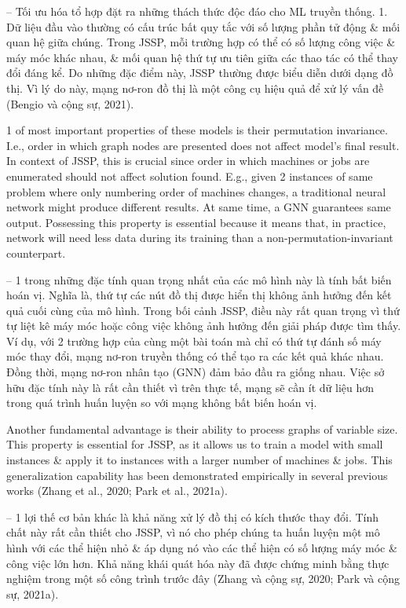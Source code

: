 \documentclass{article}
\begin{document}
\begin{itemize}
    -- Tối ưu hóa tổ hợp đặt ra những thách thức độc đáo cho ML truyền thống. 1. Dữ liệu đầu vào thường có cấu trúc bất quy tắc với số lượng phần tử động \& mối quan hệ giữa chúng. Trong JSSP, mỗi trường hợp có thể có số lượng công việc \& máy móc khác nhau, \& mối quan hệ thứ tự ưu tiên giữa các thao tác có thể thay đổi đáng kể. Do những đặc điểm này, JSSP thường được biểu diễn dưới dạng đồ thị. Vì lý do này, mạng nơ-ron đồ thị là một công cụ hiệu quả để xử lý vấn đề (Bengio và cộng sự, 2021).

    1 of most important properties of these models is their permutation invariance. I.e., order in which graph nodes are presented does not affect model's final result. In context of JSSP, this is crucial since order in which machines or jobs are enumerated should not affect solution found. E.g., given 2 instances of same problem where only numbering order of machines changes, a traditional neural network might produce different results. At same time, a GNN guarantees same output. Possessing this property is essential because it means that, in practice, network will need less data during its training than a non-permutation-invariant counterpart.

    -- 1 trong những đặc tính quan trọng nhất của các mô hình này là tính bất biến hoán vị. Nghĩa là, thứ tự các nút đồ thị được hiển thị không ảnh hưởng đến kết quả cuối cùng của mô hình. Trong bối cảnh JSSP, điều này rất quan trọng vì thứ tự liệt kê máy móc hoặc công việc không ảnh hưởng đến giải pháp được tìm thấy. Ví dụ, với 2 trường hợp của cùng một bài toán mà chỉ có thứ tự đánh số máy móc thay đổi, mạng nơ-ron truyền thống có thể tạo ra các kết quả khác nhau. Đồng thời, mạng nơ-ron nhân tạo (GNN) đảm bảo đầu ra giống nhau. Việc sở hữu đặc tính này là rất cần thiết vì trên thực tế, mạng sẽ cần ít dữ liệu hơn trong quá trình huấn luyện so với mạng không bất biến hoán vị.

    Another fundamental advantage is their ability to process graphs of variable size. This property is essential for JSSP, as it allows us to train a model with small instances \& apply it to instances with a larger number of machines \& jobs. This generalization capability has been demonstrated empirically in several previous works (Zhang et al., 2020; Park et al., 2021a).

    -- 1 lợi thế cơ bản khác là khả năng xử lý đồ thị có kích thước thay đổi. Tính chất này rất cần thiết cho JSSP, vì nó cho phép chúng ta huấn luyện một mô hình với các thể hiện nhỏ \& áp dụng nó vào các thể hiện có số lượng máy móc \& công việc lớn hơn. Khả năng khái quát hóa này đã được chứng minh bằng thực nghiệm trong một số công trình trước đây (Zhang và cộng sự, 2020; Park và cộng sự, 2021a).


\end{itemize}
\end{document}
